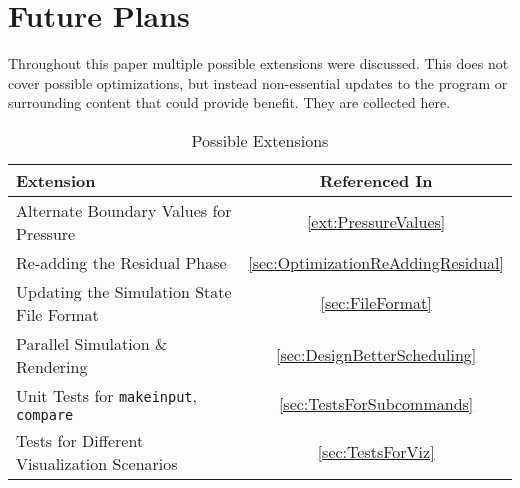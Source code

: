 \chapter{Future Plans}
\label{sec:FuturePlansAppendix}
Throughout this paper multiple possible extensions were discussed.
This does not cover possible optimizations, but instead non-essential updates to the program or surrounding content that could provide benefit.
They are collected here.

\begin{table}[h]
    \centering
    \begin{tabular}{l|c}
        Extension & Referenced In \\
        \hline
        Alternate Boundary Values for Pressure & \cref{ext:PressureValues} \\
        Re-adding the Residual Phase & \cref{sec:OptimizationReAddingResidual} \\
        Updating the Simulation State File Format & \cref{sec:FileFormat} \\
        Parallel Simulation \& Rendering & \cref{sec:DesignBetterScheduling} \\
        Unit Tests for \texttt{makeinput}, \texttt{compare} & \cref{sec:TestsForSubcommands} \\
        Tests for Different Visualization Scenarios & \cref{sec:TestsForViz} \\
    \end{tabular}
    \caption{Possible Extensions}
    \label{tab:PossibleExtensions}
\end{table}
